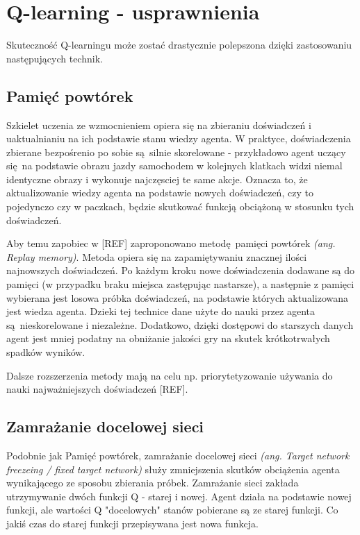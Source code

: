 \section{Q-learning - usprawnienia}\label{enhancements}
Skuteczność Q-learningu może zostać drastycznie polepszona dzięki zastosowaniu następujących technik.

\subsection{Pamięć powtórek}

Szkielet uczenia ze wzmocnieniem opiera się na zbieraniu doświadczeń i uaktualnianiu na ich podstawie stanu wiedzy agenta. W praktyce, doświadczenia zbierane bezpośrenio po sobie są silnie skorelowane - przykładowo agent uczący się na podstawie obrazu jazdy samochodem w kolejnych klatkach widzi niemal identyczne obrazy i wykonuje najczęsciej te same akcje. Oznacza to, że aktualizowanie wiedzy agenta na podstawie nowych doświadczeń, czy to pojedynczo czy w paczkach, będzie skutkować funkcją obciążoną w stosunku tych doświadczeń.

Aby temu zapobiec w [REF] zaproponowano metodę pamięci powtórek \textit{(ang. Replay memory)}. Metoda opiera się na zapamiętywaniu znacznej ilości najnowszych doświadczeń. Po każdym kroku nowe doświadczenia dodawane są do pamięci (w przypadku braku miejsca zastępując nastarsze), a następnie z pamięci wybierana jest losowa próbka doświadczeń, na podstawie których aktualizowana jest wiedza agenta. Dzieki tej technice dane użyte do nauki przez agenta są nieskorelowane i niezależne. Dodatkowo, dzięki dostępowi do starszych danych agent jest mniej podatny na obniżanie jakości gry na skutek krótkotrwałych spadków wyników.

Dalsze rozszerzenia metody mają na celu np. priorytetyzowanie używania do nauki najważniejszych doświadczeń [REF].
\subsection{Zamrażanie docelowej sieci}

Podobnie jak Pamięć powtórek, zamrażanie docelowej sieci \textit{(ang. Target network freezeing / fixed target network)} służy zmniejszenia skutków obciążenia agenta wynikającego ze sposobu zbierania próbek. Zamrażanie sieci zakłada utrzymywanie dwóch funkcji Q - starej i nowej. Agent działa na podstawie nowej funkcji, ale wartości Q "docelowych" stanów pobierane są ze starej funkcji. Co jakiś czas do starej funkcji przepisywana jest nowa funkcja.

